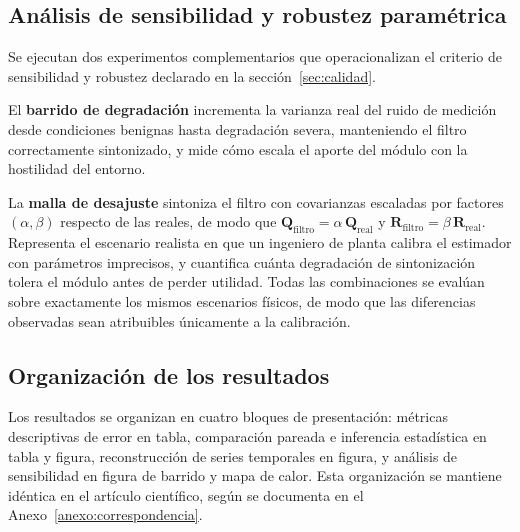 \subsection{Análisis de sensibilidad y robustez paramétrica}

Se ejecutan dos experimentos complementarios que operacionalizan el criterio de
sensibilidad y robustez declarado en la sección~\ref{sec:calidad}.

El \textbf{barrido de degradación} incrementa la varianza real del ruido de
medición desde condiciones benignas hasta degradación severa, manteniendo el
filtro correctamente sintonizado, y mide cómo escala el aporte del módulo con la
hostilidad del entorno.

La \textbf{malla de desajuste} sintoniza el filtro con covarianzas escaladas por
factores $(\alpha, \beta)$ respecto de las reales, de modo que
$\mathbf{Q}_{\text{filtro}} = \alpha\,\mathbf{Q}_{\text{real}}$ y
$\mathbf{R}_{\text{filtro}} = \beta\,\mathbf{R}_{\text{real}}$. Representa el
escenario realista en que un ingeniero de planta calibra el estimador con
parámetros imprecisos, y cuantifica cuánta degradación de sintonización tolera
el módulo antes de perder utilidad. Todas las combinaciones se evalúan sobre
exactamente los mismos escenarios físicos, de modo que las diferencias
observadas sean atribuibles únicamente a la calibración.

\subsection{Organización de los resultados}

Los resultados se organizan en cuatro bloques de presentación: métricas
descriptivas de error en tabla, comparación pareada e inferencia estadística en
tabla y figura, reconstrucción de series temporales en figura, y análisis de
sensibilidad en figura de barrido y mapa de calor. Esta organización se mantiene
idéntica en el artículo científico, según se documenta en el
Anexo~\ref{anexo:correspondencia}.

